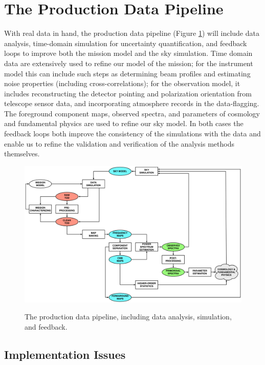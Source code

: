  
\section{The Production Data Pipeline}

With real data in hand, the production data pipeline (Figure \ref{fig_prod}) will include data analysis, time-domain simulation for uncertainty quantification, and feedback loops to improve both the mission model and the sky simulation. Time domain data are extensively used to refine our model of the mission; for the instrument model this can include such steps as determining beam profiles and estimating noise properties (including cross-correlations); for the observation model, it includes reconstructing the detector pointing and polarization orientation from telescope sensor data, and incorporating atmosphere records in the data-flagging. The foreground component maps, observed spectra, and parameters of cosmology and fundamental physics are used to refine our sky model. In both cases the feedback loops both improve the consistency of the simulations with the data and enable us to refine the validation and verification of the analysis methods themselves.

\begin{figure}[htbp]
\includegraphics[width=1.0\textwidth]{Analysis/production_figure}\\
\caption{The production data pipeline, including data analysis, simulation, and feedback.}
\label{fig_prod}
\end{figure}

\subsection{Implementation Issues}

